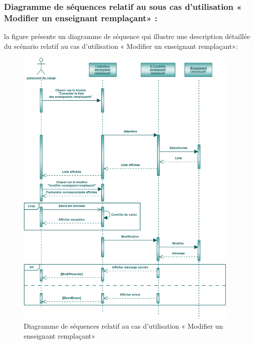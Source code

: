 \documentclass[12 pt ]{report}
\begin{document}
\subsubsection{Diagramme de séquences relatif au sous cas d’utilisation   « Modifier un enseignant remplaçant» :}
la figure   présente un diagramme de séquence qui illustre une description détaillée du scénario relatif au  cas d’utilisation   « Modifier un enseignant remplaçant»: 
\begin{figure}[h]
 \begin{center}
\includegraphics[width= 15 cm ,height=  14cm]{sec_mod_rem.PNG}
\caption{Diagramme de séquences relatif au  cas d’utilisation   «  Modifier un enseignant remplaçant»}

\end{center}
\end{figure}

\newpage
\end{document}
